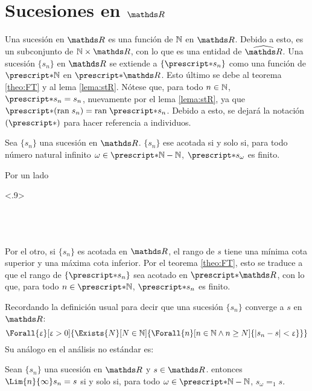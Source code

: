 \section{Sucesiones en \texorpdfstring{$\R$}{R}}

Una sucesión en $\R$ es una función de $\mathbb{N}$ en $\R$. Debido a esto, es
un subconjunto de $\N\times\R$, con lo que es una entidad de $\Rh$.
Una sucesión $\{s_n\}$ en $\R$ se extiende a $\{\st{s_n}\}$ como una función de 
$\st{\N}$ en $\st{\R}$. Esto último se debe al teorema \ref{theo:FT} y
al lema \ref{lema:stR}. Nótese que, para todo $n\in\mathbb{N}$, $\st{s_n} = s_n$,
nuevamente por el lema \ref{lema:stR}, ya que $\st{(\ran s_n)} = \ran \st{s_n}$.
Debido a esto, se dejará la notación $(\st{})$ para hacer referencia a
individuos.

\begin{theorem}
  Sea $\{s_n\}$ una sucesión en $\R$. $\{s_n\}$ ese acotada si y solo si, para todo
  número natural infinito $\omega\in\st{\N}-\N$, $\st{s_\omega}$ es
  finito.
\end{theorem}

\begin{demo}
  Por un lado
  \begin{longderivation}<.9>
      \\
    \\
      \\
    \equiv\\
  \end{longderivation}
  Por el otro, si $\{s_n\}$ es acotada en $\R$, el rango de $s$ tiene una
  mínima cota superior y una máxima cota inferior. Por el teorema
  \ref{theo:FT}, esto se traduce a que el rango de $\{\st{s_n}\}$ sea acotado
  en $\st{\R}$, con lo que, para todo $n\in\st{\N}$, $\st{s_n}$ es finito.
\end{demo}

Recordando la definición usual para decir que una sucesión $\{s_n\}$
converge a $s$ en $\R$:
\[\Forall{\e}[\e>0]{\Exists{N}[N\in\N]{\Forall{n}[n\in\N \land n\geq N]{|s_n - s| < \e}}}\]
Su análogo en el análisis no estándar es:
\begin{theorem}
  Sean $\{s_n\}$ una sucesión en $\R$ y $s\in\R$. entonces 
  $\Lim{n}{\infty} s_n = s$ si y solo si, para todo $\omega\in\st{\N} - \N$,
  $s_\omega =_1 s$.
\end{theorem}

